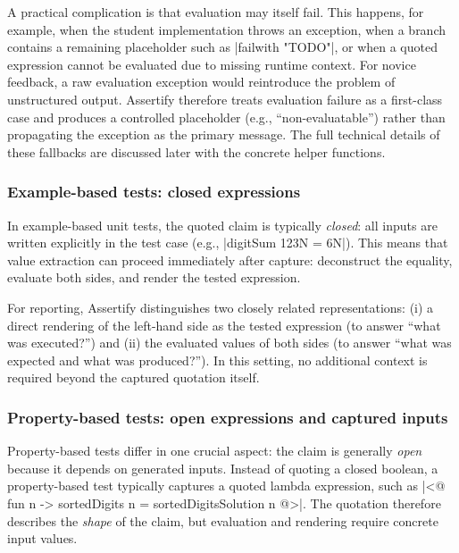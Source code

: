 \skipM A practical complication is that evaluation may itself fail. This happens,
for example, when the student implementation throws an exception, when a branch
contains a remaining placeholder such as \fsharp|failwith "TODO"|, or when a
quoted expression cannot be evaluated due to missing runtime context. For novice
feedback, a raw evaluation exception would reintroduce the problem of
unstructured output. Assertify therefore treats evaluation failure as a first-class
case and produces a controlled placeholder (e.g., ``non-evaluatable'') rather than
propagating the exception as the primary message. The full technical details of
these fallbacks are discussed later with the concrete helper functions.

\subsubsection{Example-based tests: closed expressions} %
\label{sec:value-extraction-example}

In example-based unit tests, the quoted claim is typically \emph{closed}: all
inputs are written explicitly in the test case (e.g., \fsharp|digitSum 123N = 6N|).
This means that value extraction can proceed immediately after capture:
deconstruct the equality, evaluate both sides, and render the tested expression.

\skipM For reporting, Assertify distinguishes two closely related representations:
(i) a direct rendering of the left-hand side as the tested expression (to answer
``what was executed?'') and (ii) the evaluated values of both sides (to answer
``what was expected and what was produced?''). In this setting, no additional
context is required beyond the captured quotation itself.

\subsubsection{Property-based tests: open expressions and captured inputs} %
\label{sec:value-extraction-property}

Property-based tests differ in one crucial aspect: the claim is generally
\emph{open} because it depends on generated inputs. Instead of quoting a closed
boolean, a property-based test typically captures a quoted lambda expression,
such as \fsharp|<@ fun n -> sortedDigits n = sortedDigitsSolution n @>|. The
quotation therefore describes the \emph{shape} of the claim, but evaluation and
rendering require concrete input values.

